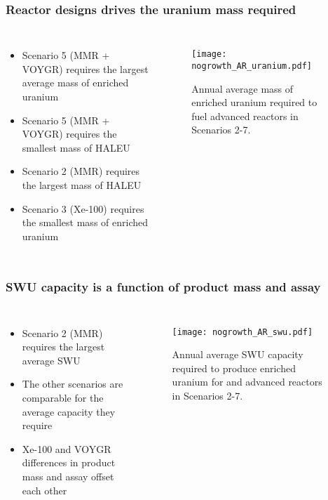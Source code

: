 \begin{frame}
    \frametitle{Reactor designs drives the uranium mass required}
    \begin{columns}
        \column[t]{4.5cm}
            \begin{itemize}
                \item Scenario 5 (MMR + VOYGR) requires the largest average mass of 
                      enriched uranium
                \item Scenario 5 (MMR + VOYGR) requires the smallest mass of \gls{HALEU}
                \item Scenario 2 (MMR) requires the largest mass of \gls{HALEU}
                \item Scenario 3 (Xe-100) requires the smallest mass of enriched 
                      uranium
                \end{itemize}
        \column[t]{6.3cm}
        \vspace{-0.8cm}
            \begin{figure}
                \centering
                \texttt{[image: nogrowth\_AR\_uranium.pdf]}
                \caption{Annual average mass of enriched uranium required to fuel
                advanced reactors in Scenarios 2-7.}
                \label{fig:ot_uranium}

        \end{figure}
    \end{columns}
\end{frame}

\begin{frame}
    \frametitle{\gls{SWU} capacity is a function of product mass and assay}
    \begin{columns}
        \column[t]{4.3cm}
            \begin{itemize}
                \item Scenario 2 (MMR) requires the largest average \gls{SWU} 
                \item The other scenarios are comparable for the average 
                      capacity they require
                \item Xe-100 and VOYGR differences in product mass and assay 
                      offset each other
                
            \end{itemize}
        \column[t]{6.3cm}
        \vspace{-1cm}
        \begin{figure}
                \centering
                \texttt{[image: nogrowth\_AR\_swu.pdf]}
                \caption{Annual average \gls{SWU} capacity required to produce 
                enriched uranium for and advanced reactors in Scenarios 2-7.}
                \label{fig:ot_swu}
        \end{figure}
    \end{columns}
\end{frame}
